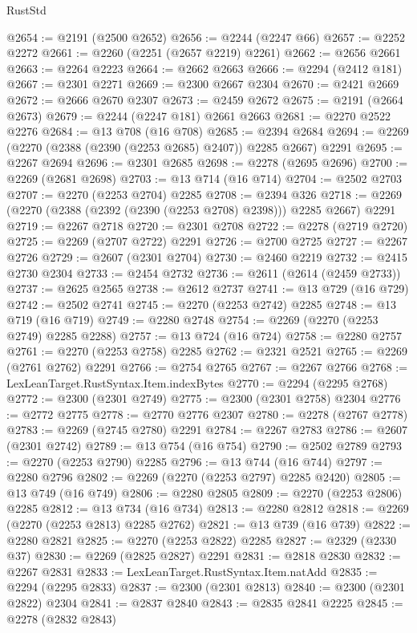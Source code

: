 \begin{lexlean}{RustStd}
\begin{coremodule}
@2654 := @2191 (@2500 @2652)
@2656 := @2244 (@2247 @66)
@2657 := @2252 @2272
@2661 := @2260 (@2251 (@2657 @2219) @2261)
@2662 := @2656 @2661
@2663 := @2264 @2223
@2664 := @2662 @2663
@2666 := @2294 (@2412 @181)
@2667 := @2301 @2271
@2669 := @2300 @2667 @2304
@2670 := @2421 @2669
@2672 := @2666 @2670 @2307
@2673 := @2459 @2672
@2675 := @2191 (@2664 @2673)
@2679 := @2244 (@2247 @181) @2661 @2663
@2681 := @2270 @2522 @2276
@2684 := @13 @708 (@16 @708)
@2685 := @2394 @2684
@2694 := @2269 (@2270 (@2388 (@2390 (@2253 @2685) @2407)) @2285 @2667) @2291
@2695 := @2267 @2694
@2696 := @2301 @2685
@2698 := @2278 (@2695 @2696)
@2700 := @2269 (@2681 @2698)
@2703 := @13 @714 (@16 @714)
@2704 := @2502 @2703
@2707 := @2270 (@2253 @2704) @2285
@2708 := @2394 @326
@2718 := @2269 (@2270 (@2388 (@2392 (@2390 (@2253 @2708) @2398))) @2285 @2667) @2291
@2719 := @2267 @2718
@2720 := @2301 @2708
@2722 := @2278 (@2719 @2720)
@2725 := @2269 (@2707 @2722) @2291
@2726 := @2700 @2725
@2727 := @2267 @2726
@2729 := @2607 (@2301 @2704)
@2730 := @2460 @2219
@2732 := @2415 @2730 @2304
@2733 := @2454 @2732
@2736 := @2611 (@2614 (@2459 @2733))
@2737 := @2625 @2565
@2738 := @2612 @2737
@2741 := @13 @729 (@16 @729)
@2742 := @2502 @2741
@2745 := @2270 (@2253 @2742) @2285
@2748 := @13 @719 (@16 @719)
@2749 := @2280 @2748
@2754 := @2269 (@2270 (@2253 @2749) @2285 @2288)
@2757 := @13 @724 (@16 @724)
@2758 := @2280 @2757
@2761 := @2270 (@2253 @2758) @2285
@2762 := @2321 @2521
@2765 := @2269 (@2761 @2762) @2291
@2766 := @2754 @2765
@2767 := @2267 @2766
@2768 := LexLeanTarget.RustSyntax.Item.indexBytes
@2770 := @2294 (@2295 @2768)
@2772 := @2300 (@2301 @2749)
@2775 := @2300 (@2301 @2758) @2304
@2776 := @2772 @2775
@2778 := @2770 @2776 @2307
@2780 := @2278 (@2767 @2778)
@2783 := @2269 (@2745 @2780) @2291
@2784 := @2267 @2783
@2786 := @2607 (@2301 @2742)
@2789 := @13 @754 (@16 @754)
@2790 := @2502 @2789
@2793 := @2270 (@2253 @2790) @2285
@2796 := @13 @744 (@16 @744)
@2797 := @2280 @2796
@2802 := @2269 (@2270 (@2253 @2797) @2285 @2420)
@2805 := @13 @749 (@16 @749)
@2806 := @2280 @2805
@2809 := @2270 (@2253 @2806) @2285
@2812 := @13 @734 (@16 @734)
@2813 := @2280 @2812
@2818 := @2269 (@2270 (@2253 @2813) @2285 @2762)
@2821 := @13 @739 (@16 @739)
@2822 := @2280 @2821
@2825 := @2270 (@2253 @2822) @2285
@2827 := @2329 (@2330 @37)
@2830 := @2269 (@2825 @2827) @2291
@2831 := @2818 @2830
@2832 := @2267 @2831
@2833 := LexLeanTarget.RustSyntax.Item.natAdd
@2835 := @2294 (@2295 @2833)
@2837 := @2300 (@2301 @2813)
@2840 := @2300 (@2301 @2822) @2304
@2841 := @2837 @2840
@2843 := @2835 @2841 @2225
@2845 := @2278 (@2832 @2843)

\end{coremodule}
\end{lexlean}
